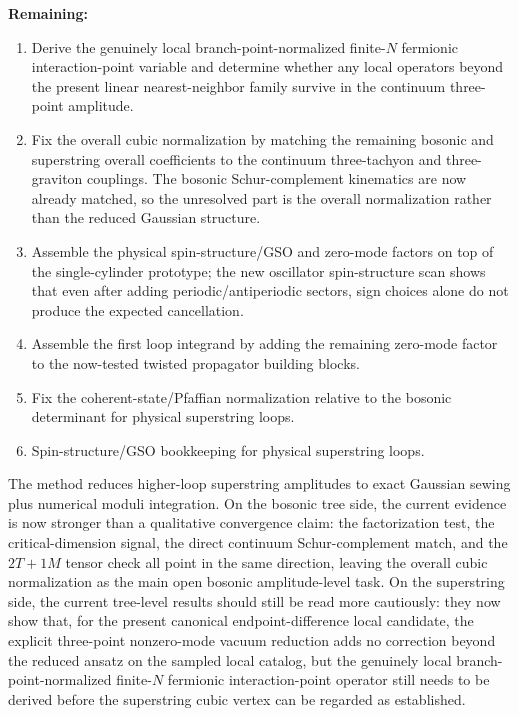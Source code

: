 \documentclass[11pt]{article}
\begin{document}
\textbf{Remaining:}
\begin{enumerate}
\item Derive the genuinely local branch-point-normalized finite-$N$ fermionic interaction-point variable and determine whether any local operators beyond the present linear nearest-neighbor family survive in the continuum three-point amplitude.
\item Fix the overall cubic normalization by matching the remaining bosonic and superstring overall coefficients to the continuum three-tachyon and three-graviton couplings. The bosonic Schur-complement kinematics are now already matched, so the unresolved part is the overall normalization rather than the reduced Gaussian structure.
\item Assemble the physical spin-structure/GSO and zero-mode factors on top of the single-cylinder prototype; the new oscillator spin-structure scan shows that even after adding periodic/antiperiodic sectors, sign choices alone do not produce the expected cancellation.
\item Assemble the first loop integrand by adding the remaining zero-mode factor to the now-tested twisted propagator building blocks.
\item Fix the coherent-state/Pfaffian normalization relative to the bosonic determinant for physical superstring loops.
\item Spin-structure/GSO bookkeeping for physical superstring loops.
\end{enumerate}

The method reduces higher-loop superstring amplitudes to exact Gaussian sewing plus numerical moduli integration. On the bosonic tree side, the current evidence is now stronger than a qualitative convergence claim: the factorization test, the critical-dimension signal, the direct continuum Schur-complement match, and the $2T+1M$ tensor check all point in the same direction, leaving the overall cubic normalization as the main open bosonic amplitude-level task. On the superstring side, the current tree-level results should still be read more cautiously: they now show that, for the present canonical endpoint-difference local candidate, the explicit three-point nonzero-mode vacuum reduction adds no correction beyond the reduced ansatz on the sampled local catalog, but the genuinely local branch-point-normalized finite-$N$ fermionic interaction-point operator still needs to be derived before the superstring cubic vertex can be regarded as established.
\end{document}
